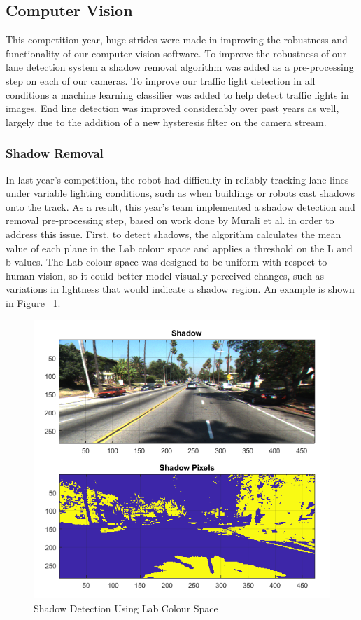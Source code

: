 \documentclass[11pt,journal]{IEEEtran}
\begin{document}
\subsection{Computer Vision}
This competition year, huge strides were made in improving the robustness and functionality of our computer vision software. To improve the robustness of our lane detection system a shadow removal algorithm was added as a pre-processing step on each of our cameras. To improve our traffic light detection in all conditions a machine learning classifier was added to help detect traffic lights in images. End line detection was improved considerably over past years as well, largely due to the addition of a new hysteresis filter on the camera stream. 

\subsubsection{Shadow Removal}
In last year's competition, the robot had difficulty in reliably tracking lane lines under variable lighting conditions, such as when buildings or robots cast shadows onto the track. As a result, this year's team implemented a shadow detection and removal pre-processing step, based on work done by Murali et al. \cite{ShadRemoval} in order to address this issue.
First, to detect shadows, the algorithm calculates the mean value of each plane in the Lab colour space and applies a threshold on the L and b values. The Lab colour space was designed to be uniform with respect to human vision, so it could better model visually perceived changes, such as variations in lightness that would indicate a shadow region. An example is shown in Figure ~\ref{Shadow1}.
\begin{figure}[ht]
\centerline{\includegraphics[width=0.9\columnwidth]{X1.png}}
\caption{Shadow Detection Using Lab Colour Space}
\label{Shadow1}
\end{figure}
\end{document}
